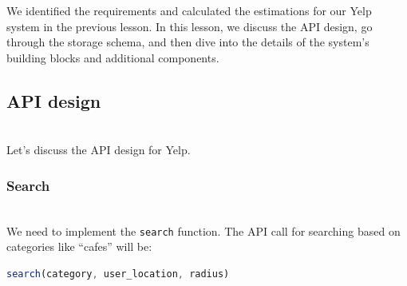 

We identified the requirements and calculated the estimations for our Yelp system in the previous lesson. In this lesson, we discuss the API design, go through the storage schema, and then dive into the details of the system's building blocks and additional components.

\subsection{API design}\label{05mmmSTJ18Mes17g9mklG}
\\
Let's discuss the API design for Yelp.

\subsubsection{Search}\label{SOk21pVYaTlvzplH6qWmK}
\\
We need to implement the \texttt{search} function. The API call for searching based on categories like ``cafes'' will be:

\begin{lstlisting}[language=JavaScript]
search(category, user_location, radius)
\end{lstlisting}

\begin{table}[htbp]
\centering
\small
{}
\end{table}

